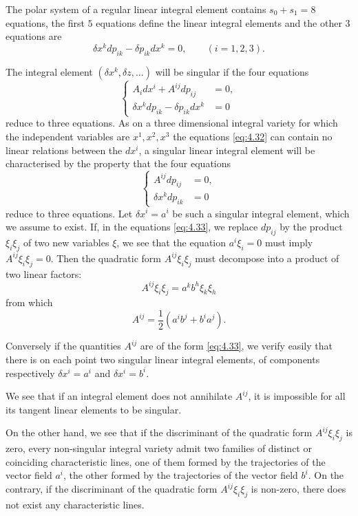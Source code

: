 \documentclass[leqno,11pt]{book}
\numberwithin{equation}{chapter}
\theoremstyle{shape1}
\theoremstyle{shape0}
\theoremstyle{shape2}
\theoremstyle{definition}
\begin{document}
The polar system of a regular linear integral element contains $s_{0}+s_{1}=8$ equations, the first $5$ equations define the linear integral elements and the other $3$ equations are
\[
\delta x^{k}dp_{ik}-\delta p_{ik}dx^{k}=0,\qquad (i=1,2,3).
\]

The integral element $(\delta x^{k},\delta z,\dots)$ will be singular if the four equations
\begin{equation}
  \label{eq:4.32}
\left\{\begin{aligned}
  A_{i}dx^{i}+A^{ij}dp_{ij}&=0,\\
  \delta x^{k}dp_{ik}-\delta p_{ik}dx^{k}&=0
\end{aligned}\right.
\end{equation}
reduce to three equations. As on a three dimensional integral variety for which the independent variables are $x^{1},x^{2},x^{3}$ the equations \eqref{eq:4.32} can contain no linear relations between the $dx^{i}$, a singular linear integral element will be characterised by the property that the four equations
\begin{equation}
  \label{eq:4.33}
  \left\{
    \begin{aligned}
      A^{ij}dp_{ij}&=0,\\
      \delta x^{k}dp_{ik}&=0
    \end{aligned}
\right.
\end{equation}
reduce to three equations. Let $\delta x^{i}=a^{i}$ be such a singular integral element, which we assume to exist. If, in the equations \eqref{eq:4.33}, we replace $dp_{ij}$ by the product $\xi_{i}\xi_{j}$ of two new variables $\xi$, we see that the equation $a^{i}\xi_{i}=0$ must imply $A^{ij}\xi_{i}\xi_{j}=0$. Then the quadratic form $A^{ij}\xi_{i}\xi_{j}$ must decompose into a product of two linear factors:
\[
A^{ij}\xi_{i}\xi_{j}=a^{k}b^{h}\xi_{k}\xi_{h}
\]
from which
\begin{equation}
  \label{eq:4.34}
  A^{ij}=\frac{1}{2}(a^{i}b^{j}+b^{i}a^{j}).
\end{equation}

Conversely if the quantities $A^{ij}$ are of the form \eqref{eq:4.33}, we verify easily that there is on each point two singular linear integral elements, of components respectively $\delta x^{i}=a^{i}$ and $\delta x^{i}=b^{i}$.

We see that if an integral element does not annihilate $A^{ij}$, it is impossible for all its tangent linear elements to be singular.

On the other hand, we see that if the discriminant of the quadratic form $A^{ij}\xi_{i}\xi_{j}$ is zero, every non-singular integral variety admit two families of distinct or coinciding characteristic lines, one of them formed by the trajectories of the vector field $a^{i}$, the other formed  by the trajectories of the vector field $b^{i}$. On the contrary, if the discriminant of the quadratic form $A^{ij}\xi_{i}\xi_{j}$ is non-zero, there does not exist any characteristic lines.
\end{document}
